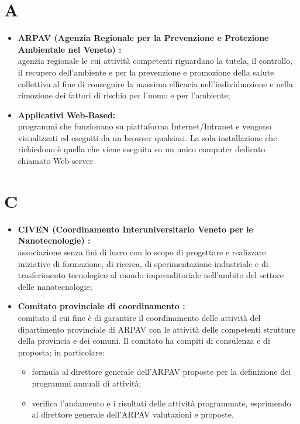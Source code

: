 \documentclass[11pt]{book}              %
\begin{document}
\section*{A}

\begin{itemize}
	\item \textbf{{\color{OliveGreen}ARPAV} (Agenzia Regionale per la Prevenzione e Protezione Ambientale nel Veneto) :}\\
	 agenzia regionale le cui attività competenti riguardano la tutela, il controllo, il recupero dell'ambiente e per la prevenzione e promozione della salute collettiva al fine di conseguire la massima efficacia nell'individuazione e nella rimozione dei fattori di rischio per l'uomo e per l'ambiente;
	\item \textbf{{\color{Plum} Applicativi Web-Based}:} \\
	 programmi che funzionano su piattaforma Internet/Intranet e vengono visualizzati ed eseguiti da un browser qualsiasi. La sola installazione che richiedono è quella che viene eseguita su un unico computer dedicato chiamato Web-server
\end{itemize}

\section*{C}
\begin{itemize}

	

	\item \textbf{{\color{OliveGreen}CIVEN} (Coordinamento Interuniversitario Veneto per le Nanotecnologie) :}\\
	 associazione senza fini di lucro con lo scopo di progettare e realizzare iniziative di formazione, di ricerca, di sperimentazione industriale e di trasferimento tecnologico al mondo imprenditoriale nell'ambito del settore delle nanotecnologie;

	\item \textbf{{\color{Plum}Comitato provinciale di coordinamento }:} \\
	comitato il cui fine è di garantire il coordinamento delle attività del dipartimento provinciale di ARPAV con le attività delle competenti strutture della provincia e dei comuni. 
	Il comitato ha compiti di consulenza e di proposta; in particolare:
	\begin{itemize}
		\item formula al direttore generale dell’ARPAV proposte per la definizione dei programmi annuali di attività;
		\item verifica l'andamento e i risultati delle attività programmate, esprimendo al direttore generale dell'ARPAV valutazioni e proposte. 
	\end{itemize}
	

\end{itemize}
\end{document}
